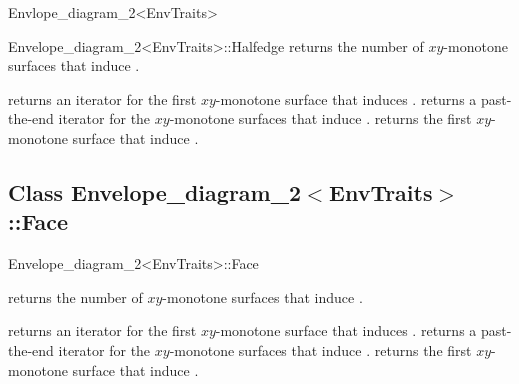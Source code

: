 \begin{ccRefClass}{Envlope_diagram_2<EnvTraits>}
\begin{ccClass}{Envelope_diagram_2<EnvTraits>::Halfedge}
{returns the number of $xy$-monotone surfaces that induce \ccVar.}

{returns an iterator for the first $xy$-monotone surface that induces \ccVar.}
\ccGlue
{}
{returns a past-the-end iterator for the $xy$-monotone surfaces that induce
 \ccVar.}
{returns the first $xy$-monotone surface that induce \ccVar.
 }

\end{ccClass}


\subsection*{Class Envelope\_diagram\_2$<$EnvTraits$>$::Face}

\begin{ccClass}{Envelope_diagram_2<EnvTraits>::Face}

\ccInheritsFrom

\ccAccessFunctions

{returns the number of $xy$-monotone surfaces that induce \ccVar.}

{returns an iterator for the first $xy$-monotone surface that induces \ccVar.}
\ccGlue
{}
{returns a past-the-end iterator for the $xy$-monotone surfaces that induce
 \ccVar.}
{returns the first $xy$-monotone surface that induce \ccVar.
 }

\end{ccClass}


\end{ccRefClass}

\ccRefPageEnd


